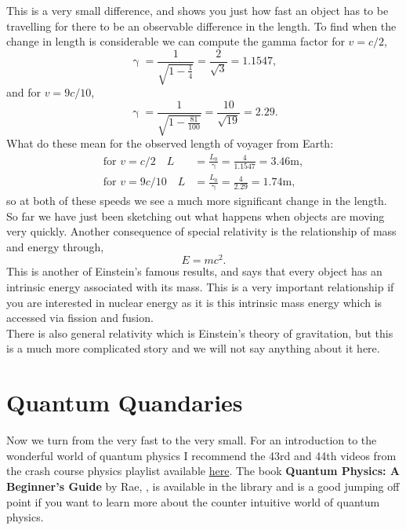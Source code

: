 \documentclass[a4paper,12pt]{book}
\begin{document}
This is a very small difference, and shows you just how fast an object has to be travelling for there to be an observable difference in the length. To find when the change in length is considerable we can compute the gamma factor for $v=c/2$,
\begin{equation*}
\upgamma=\frac{1}{\sqrt{1-\frac{1}{4}}}=\frac{2}{\sqrt{3}}=1.1547,
\end{equation*}
and for $v=9c/10$,
\begin{equation*}
\upgamma=\frac{1}{\sqrt{1-\frac{81}{100}}}=\frac{10}{\sqrt{19}}=2.29.
\end{equation*}
What do these mean for the observed length of voyager from Earth:
\begin{align*}
\text{for } v=c/2 \quad L&=\frac{L_{0}}{\upgamma}=\frac{4}{1.1547}=3.46\text{m},\\
\text{for } v=9c/10 \quad L&=\frac{L_{0}}{\upgamma}=\frac{4}{2.29}=1.74\text{m},
\end{align*}
so at both of these speeds we see a much more significant change in the length.\\

So far we have just been sketching out what happens when objects are moving very quickly. Another consequence of special relativity is the relationship of mass and energy through,
\begin{equation}
E=mc^{2}.
\end{equation}
This is another of Einstein's famous results, and says that every object has an intrinsic energy associated with its mass. This is a very important relationship if you are interested in nuclear energy as it is this intrinsic mass energy which is accessed via fission and fusion. \\

There is also general relativity which is Einstein's theory of gravitation, but this is a much more complicated story and we will not say anything about it here.

\section{Quantum Quandaries}
Now we turn from the very fast to the very small.  For an introduction to the wonderful world of quantum physics I recommend the 43rd and 44th videos from the crash course physics playlist available \href{https://www.youtube.com/playlist?list=PL8dPuuaLjXtN0ge7yDk_UA0ldZJdhwkoV}{here}.  The book \textbf{Quantum Physics: A Beginner's Guide } by Rae, \citep{rae2005quantum}, is available in the library and is a good jumping off point if you want to learn more about the counter intuitive world of quantum physics.\\
\end{document}
